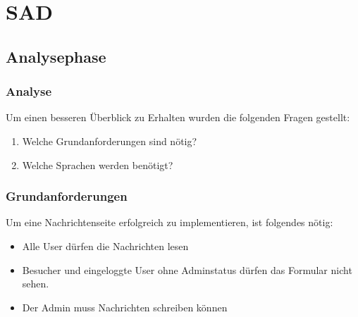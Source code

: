 \section{SAD}
\subsection{Analysephase}
\begin{frame} %
  \frametitle{Analyse} %

  Um einen besseren Überblick zu Erhalten wurden die folgenden Fragen gestellt:
  \begin{enumerate}
   \item Welche Grundanforderungen sind nötig?
   \item Welche Sprachen werden benötigt?
  \end{enumerate}

\end{frame}

\begin{frame} %
  \frametitle{Grundanforderungen} %

   Um eine Nachrichtenseite erfolgreich zu implementieren, ist folgendes nötig:
   \begin{itemize}
   	\item Alle User dürfen die Nachrichten lesen
    \item Besucher und eingeloggte User ohne Adminstatus dürfen das Formular nicht sehen.
    \item Der Admin muss Nachrichten schreiben können
   \end{itemize}

\end{frame}

